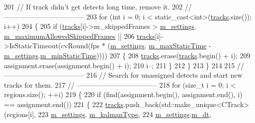 \begin{DoxyCode}
201         \textcolor{comment}{// If track didn't get detects long time, remove it.}
202         \textcolor{comment}{// -----------------------------------}
203         \textcolor{keywordflow}{for} (\textcolor{keywordtype}{int} i = 0; i < static\_cast<int>(\mbox{\hyperlink{class_c_tracker_a86d322bc042985711c8d5ec8b9614230}{tracks}}.size()); i++)
204         \{
205             \textcolor{keywordflow}{if} (\mbox{\hyperlink{class_c_tracker_a86d322bc042985711c8d5ec8b9614230}{tracks}}[i]->m\_skippedFrames > \mbox{\hyperlink{class_c_tracker_acb84aee0d550f4cdadbfac6735811050}{m\_settings}}.
      \mbox{\hyperlink{struct_tracker_settings_a7825c3e88ee979fba2844c238fc51139}{m\_maximumAllowedSkippedFrames}} ||
206                     \mbox{\hyperlink{class_c_tracker_a86d322bc042985711c8d5ec8b9614230}{tracks}}[i]->IsStaticTimeout(cvRound(fps * (\mbox{\hyperlink{class_c_tracker_acb84aee0d550f4cdadbfac6735811050}{m\_settings}}.
      \mbox{\hyperlink{struct_tracker_settings_a810f1687289a964756cd700a22d219d2}{m\_maxStaticTime}} - \mbox{\hyperlink{class_c_tracker_acb84aee0d550f4cdadbfac6735811050}{m\_settings}}.\mbox{\hyperlink{struct_tracker_settings_aee7628ff95fa54ad4422e01d45690a6d}{m\_minStaticTime}}))))
207             \{
208                 \mbox{\hyperlink{class_c_tracker_a86d322bc042985711c8d5ec8b9614230}{tracks}}.erase(\mbox{\hyperlink{class_c_tracker_a86d322bc042985711c8d5ec8b9614230}{tracks}}.begin() + i);
209                 assignment.erase(assignment.begin() + i);
210                 i--;
211             \}
212         \}
213     \}
214 
215     \textcolor{comment}{// -----------------------------------}
216     \textcolor{comment}{// Search for unassigned detects and start new tracks for them.}
217     \textcolor{comment}{// -----------------------------------}
218     \textcolor{keywordflow}{for} (\textcolor{keywordtype}{size\_t} i = 0; i < regions.size(); ++i)
219     \{
220         \textcolor{keywordflow}{if} (find(assignment.begin(), assignment.end(), i) == assignment.end())
221         \{
222             \mbox{\hyperlink{class_c_tracker_a86d322bc042985711c8d5ec8b9614230}{tracks}}.push\_back(std::make\_unique<CTrack>(regions[i],
223                                                       \mbox{\hyperlink{class_c_tracker_acb84aee0d550f4cdadbfac6735811050}{m\_settings}}.
      \mbox{\hyperlink{struct_tracker_settings_a3856a809067135c1c3f2d3c61fc4d6b7}{m\_kalmanType}},
224                                                       \mbox{\hyperlink{class_c_tracker_acb84aee0d550f4cdadbfac6735811050}{m\_settings}}.\mbox{\hyperlink{struct_tracker_settings_ae876ad4f3599a782cddb37e318430aaa}{m\_dt}},

\end{DoxyCode}
